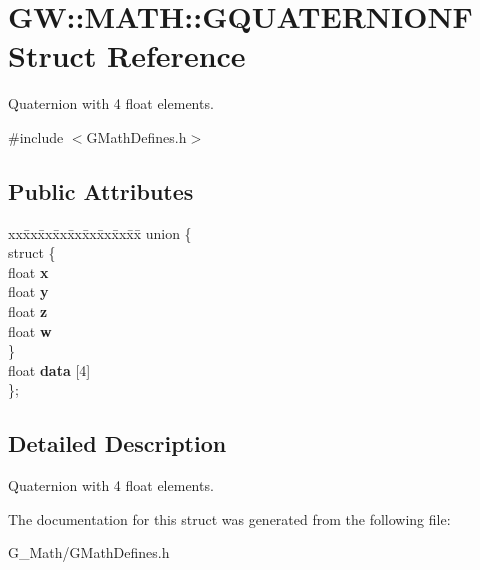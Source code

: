 \hypertarget{struct_g_w_1_1_m_a_t_h_1_1_g_q_u_a_t_e_r_n_i_o_n_f}{}\section{GW\+:\+:M\+A\+TH\+:\+:G\+Q\+U\+A\+T\+E\+R\+N\+I\+O\+NF Struct Reference}
\label{struct_g_w_1_1_m_a_t_h_1_1_g_q_u_a_t_e_r_n_i_o_n_f}


Quaternion with 4 float elements.  




{\ttfamily \#include $<$G\+Math\+Defines.\+h$>$}

\subsection*{Public Attributes}
\begin{DoxyCompactItemize}
\item 
\mbox{\label{struct_g_w_1_1_m_a_t_h_1_1_g_q_u_a_t_e_r_n_i_o_n_f_a7c2433cf1a05874f7171de87965d1430}} 
\begin{tabbing}
xx\=xx\=xx\=xx\=xx\=xx\=xx\=xx\=xx\=\kill
union \{\\
\mbox{\label{union_g_w_1_1_m_a_t_h_1_1_g_q_u_a_t_e_r_n_i_o_n_f_1_1_0D20_ae51a5baccd54f6515b443e64d7207045}} 
\>struct \{\\
\>\>float {\bfseries x}\\
\>\>float {\bfseries y}\\
\>\>float {\bfseries z}\\
\>\>float {\bfseries w}\\
\>\} \\
\>float {\bfseries data} \mbox{[}4\mbox{]}\\
\}; \\

\end{tabbing}\end{DoxyCompactItemize}


\subsection{Detailed Description}
Quaternion with 4 float elements. 

The documentation for this struct was generated from the following file\+:\begin{DoxyCompactItemize}
\item 
G\+\_\+\+Math/G\+Math\+Defines.\+h\end{DoxyCompactItemize}
